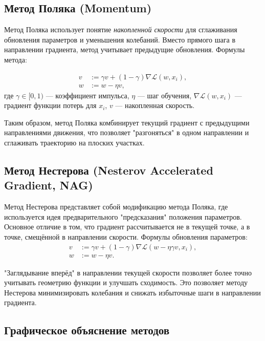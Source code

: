\subsection*{Метод Поляка (Momentum)}

Метод Поляка использует понятие \textit{накопленной скорости} для сглаживания обновления параметров и уменьшения колебаний. Вместо прямого шага в направлении градиента, метод учитывает предыдущие обновления. Формулы метода:

\begin{equation*}
\begin{aligned}
    v &:= \gamma v + (1 - \gamma) \nabla \mathcal{L}(w, x_i), \\
    w &:= w - \eta v,
\end{aligned}
\end{equation*}
где $\gamma \in [0, 1)$ — коэффициент импульса, $\eta$ — шаг обучения, $\nabla \mathcal{L}(w, x_i)$ — градиент функции потерь для $x_i$, $v$ — накопленная скорость.

Таким образом, метод Поляка комбинирует текущий градиент с предыдущими направлениями движения, что позволяет "разгоняться" в одном направлении и сглаживать траекторию на плоских участках.

\subsection*{Метод Нестерова (Nesterov Accelerated Gradient, NAG)}

Метод Нестерова представляет собой модификацию метода Поляка, где используется идея предварительного "предсказания" положения параметров. Основное отличие в том, что градиент рассчитывается не в текущей точке, а в точке, смещённой в направлении скорости. Формулы обновления параметров:
\begin{equation*}
\begin{aligned}
    v &:= \gamma v + (1 - \gamma) \nabla \mathcal{L}(w - \eta \gamma v, x_i), \\
    w &:= w - \eta v.
\end{aligned}
\end{equation*}

"Заглядывание вперёд" в направлении текущей скорости позволяет более точно учитывать геометрию функции и улучшать сходимость. Это позволяет методу Нестерова минимизировать колебания и снижать избыточные шаги в направлении градиента.

\subsection*{Графическое объяснение методов}


